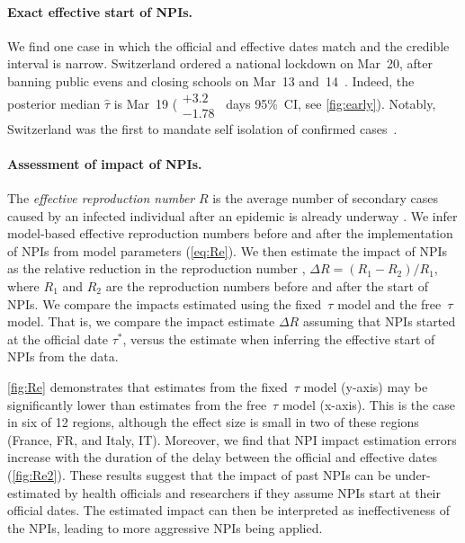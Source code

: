 \documentclass[12pt]{extarticle}
\begin{document}
\paragraph*{Exact effective start of NPIs.}
We find one case in which the official and effective dates match and the credible interval is narrow.
Switzerland ordered a national lockdown on Mar~20, after banning public evens and closing schools on Mar~13 and~14~\citep{Flaxman2020}.
Indeed, the posterior median $\hat{\tau}$ is Mar~19 ($\substack{+3.2 \\ -1.78}$~days 95\%~CI, see \autoref{fig:early}). 
Notably, Switzerland was the first to mandate self isolation of confirmed cases~\citep{Flaxman2020}.



\paragraph*{Assessment of impact of NPIs.}
The \emph{effective reproduction number} $R$ is the average number of secondary
cases caused by an infected individual after an epidemic is already underway \citep{Bar-On2020a}.
We infer model-based effective reproduction numbers before and after the implementation of NPIs from model parameters (\autoref{eq:Re}).
We then estimate the impact of NPIs as the relative reduction in the reproduction number \citep{Flaxman2020}, $\Delta R = (R_1-R_2)/R_1$, where $R_1$ and $R_2$ are the reproduction numbers before and after the start of NPIs. 
We compare the impacts estimated using the fixed~$\tau$ model and the free~$\tau$ model.
That is, we compare the impact estimate $\Delta R$ assuming that NPIs started at the official date $\tau^*$, versus the estimate when inferring the effective start of NPIs from the data.

\autoref{fig:Re} demonstrates that estimates from the fixed~$\tau$ model (y-axis) may be significantly lower than estimates from the free~$\tau$ model (x-axis).
This is the case in six of 12 regions, although the effect size is small in two of these regions (France, FR, and Italy, IT).
Moreover, we find that NPI impact estimation errors increase with the duration of the delay between the official and effective dates (\autoref{fig:Re2}).
These results suggest that the impact of past NPIs can be under-estimated by health officials and researchers if they assume NPIs start at their official dates.
The estimated impact can then be interpreted as ineffectiveness of the NPIs, leading to more aggressive NPIs being applied.
\end{document}
